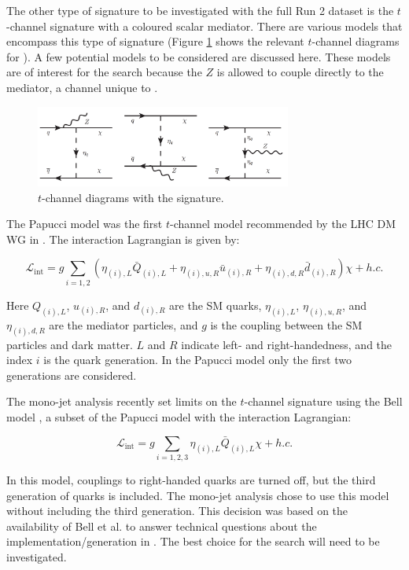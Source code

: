 The other type of signature to be investigated with the full Run 2 dataset is the $t$-channel signature with a coloured scalar mediator. There are various models that encompass this type of signature (Figure \ref{fig:tchan_bell} shows the relevant $t$-channel diagrams for \monoZ). A few potential models to be considered are discussed here. These models are of interest for the \monoZ search because the $Z$ is allowed to couple directly to the mediator, a channel unique to \monoZ.

\begin{figure}[htb]
\centering
\includegraphics[width=0.75\textwidth]{Figures/tchan_bell.png}
\caption{$t$-channel diagrams with the \monoZ signature.}
\label{fig:tchan_bell}
\end{figure}

The Papucci model \cite{Papucci:2014iwa} was the first $t$-channel model recommended by the LHC DM WG in \cite{Abercrombie:2015wmb}. The interaction Lagrangian is given by:

\begin{equation}
\mathcal{L}_\text{int} = g \sum_{i=1,2} \left( \eta_{(i),L} \bar{Q}_{(i),L} + \eta_{(i),u,R} \bar{u}_{(i),R} + \eta_{(i),d,R} \bar{d}_{(i),R} \right) \chi + h.c.
\end{equation}

\noindent Here $Q_{(i),L}$, $u_{(i),R}$, and $d_{(i),R}$ are the SM quarks, $\eta_{(i),L}$, $\eta_{(i),u,R}$, and $\eta_{(i),d,R}$ are the mediator particles, and $g$ is the coupling between the SM particles and dark matter. $L$ and $R$ indicate left- and right-handedness, and the index $i$ is the quark generation. In the Papucci model only the first two generations are considered. 

The mono-jet analysis recently set limits on the $t$-channel signature using the Bell model \cite{Bell:2012rg}, a subset of the Papucci model with the interaction Lagrangian:

\begin{equation}
\mathcal{L}_\text{int} = g \sum_{i=1,2,3} \eta_{(i),L} \bar{Q}_{(i),L} \chi + h.c.
\end{equation}

\noindent In this model, couplings to right-handed quarks are turned off, but the third generation of quarks is included. The mono-jet analysis chose to use this model without including the third generation. This decision was based on the availability of Bell et al.\xspace to answer technical questions about the implementation/generation in \madgraph. The best choice for the \monoZ search will need to be investigated.

